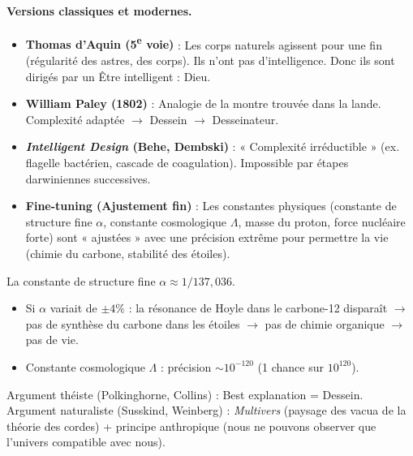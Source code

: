 \documentclass[11pt]{article}
\newcommand{\cle}[1]{{\popxbold\color{popdark}#1}}
\begin{document}
\paragraph{Versions classiques et modernes.}
\begin{itemize}
    \item \textbf{Thomas d'Aquin (5\textsuperscript{e} voie)} : Les corps naturels agissent pour une fin (régularité des astres, des corps). Ils n'ont pas d'intelligence. Donc ils sont dirigés par un Être intelligent : Dieu.
    \item \textbf{William Paley (1802)} : Analogie de la montre trouvée dans la lande. Complexité adaptée $\rightarrow$ Dessein $\rightarrow$ Desseinateur.
    \item \textbf{\emph{Intelligent Design} (Behe, Dembski)} : « Complexité irréductible » (ex. flagelle bactérien, cascade de coagulation). Impossible par étapes darwiniennes successives.
    \item \textbf{Fine-tuning (Ajustement fin)} : Les constantes physiques (constante de structure fine $\alpha$, constante cosmologique $\Lambda$, masse du proton, force nucléaire forte) sont « ajustées » avec une précision extrême pour permettre la vie (chimie du carbone, stabilité des étoiles).
\end{itemize}

\begin{exemplebox}
La \cle{constante de structure fine} $\alpha \approx 1/137,036$.
\begin{itemize}
    \item Si $\alpha$ variait de $\pm 4\%$ : la résonance de Hoyle dans le carbone-12 disparaît $\rightarrow$ pas de synthèse du carbone dans les étoiles $\rightarrow$ pas de chimie organique $\rightarrow$ pas de vie.
    \item Constante cosmologique $\Lambda$ : précision $\sim 10^{-120}$ (1 chance sur $10^{120}$).
\end{itemize}
Argument théiste (Polkinghorne, Collins) : Best explanation = Dessein. Argument naturaliste (Susskind, Weinberg) : \emph{Multivers} (paysage des vacua de la théorie des cordes) + principe anthropique (nous ne pouvons observer que l'univers compatible avec nous).
\end{exemplebox}
\end{document}
